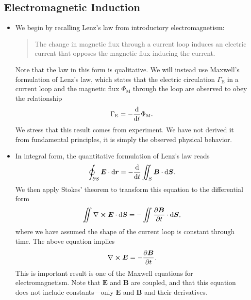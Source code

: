 \documentclass[11pt, a4paper]{article}
\newcommand{\diff}{\mathop{}\!\mathrm{d}} %
\renewcommand{\vec}[1]{\bm{#1}} %
\renewcommand{\r}{\vec{r}}
\newcommand{\E}{\vec{E}} %
\newcommand{\B}{\vec{B}} %
\renewcommand{\curl}{\nabla \cross}
\begin{document}
\subsection{Electromagnetic Induction}
\begin{itemize}
	\item We begin by recalling Lenz's law from introductory electromagnetism:
    \begin{quote}
        The change in magnetic flux through a current loop induces an electric current that opposes the magnetic flux inducing the current. 
    \end{quote}
	Note that the law in this form is qualitative. We will instead use Maxwell's formulation of Lenz's law, which states that the electric circulation $ \Gamma_{\mathrm{E}} $ in a current loop and the magnetic flux $ \Phi_{\mathrm{M}} $ through the loop are observed to obey the relationship
	\begin{equation*}
		\Gamma_{\mathrm{E}} = -\dv{t} \Phi_{\mathrm{M}}.
	\end{equation*}
    We stress that this result comes from experiment. We have not derived it from fundamental principles, it is simply the observed physical behavior.
	
	\item In integral form, the quantitative formulation of Lenz's law reads
	\begin{equation*}
		\oint_{\partial S}\E \cdot \diff \r = - \dv{t} \iint_{S} \B \cdot \diff \vec{S}.
	\end{equation*}
	We then apply Stokes' theorem to transform this equation to the differential form
	\begin{equation*}
		\iint \curl \E \cdot \diff \vec{S} = - \iint \pdv{\B}{t} \cdot \diff \vec{S},
	\end{equation*}
    where we have assumed the shape of the current loop is constant through time. The above equation implies
	\begin{equation*}
		\curl \E = - \pdv{\B}{t}.
	\end{equation*}
	This is important result is one of the Maxwell equations for electromagnetism. Note that $ \E $ and $ \B $ are coupled, and that this equation does not include constants---only $ \E $ and $ \B $ and their derivatives. 
	
\end{itemize}
\end{document}
